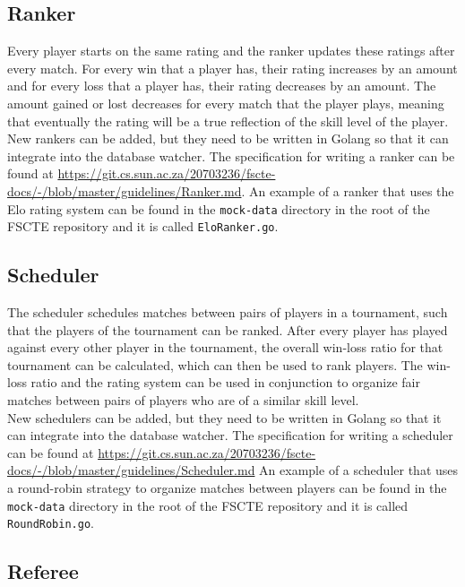\documentclass[a4paper, 11pt]{report}
\begin{document}
\subsection{Ranker}
\label{sec:ranker}

Every player starts on the same rating and the ranker updates these ratings
after every match. For every win that a player has, their rating increases by
an amount and for every loss that a player has, their rating decreases by
an amount. The amount gained or lost decreases for every match that the player
plays, meaning that eventually the rating will be a true reflection of the skill
level of the player. \\

New rankers can be added, but they need to be written in Golang so that it can
integrate into the database watcher. The specification for writing a ranker can
be found at \url{https://git.cs.sun.ac.za/20703236/fscte-docs/-/blob/master/guidelines/Ranker.md}.
An example of a ranker that uses the Elo \cite{elo} rating system can be found in
the \texttt{mock-data} directory in the root of the FSCTE repository and it is
called \texttt{EloRanker.go}.

\subsection{Scheduler}
\label{sec:scheduler}

The scheduler schedules matches between pairs of players in a tournament, such
that the players of the tournament can be ranked. After every player has played
against every other player in the tournament, the overall win-loss ratio for
that tournament can be calculated, which can then be used to rank players. The
win-loss ratio and the rating system can be used in conjunction to organize fair
matches between pairs of players who are of a similar skill level. \\

New schedulers can be added, but they need to be written in Golang so that it
can integrate into the database watcher. The specification for writing a scheduler
can be found at \url{https://git.cs.sun.ac.za/20703236/fscte-docs/-/blob/master/guidelines/Scheduler.md}
An example of a scheduler that uses a round-robin strategy to organize matches
between players can be found in the \texttt{mock-data} directory in the root of
the FSCTE repository and it is called \texttt{RoundRobin.go}.

\subsection{Referee}
\label{sec:referee}
\end{document}
